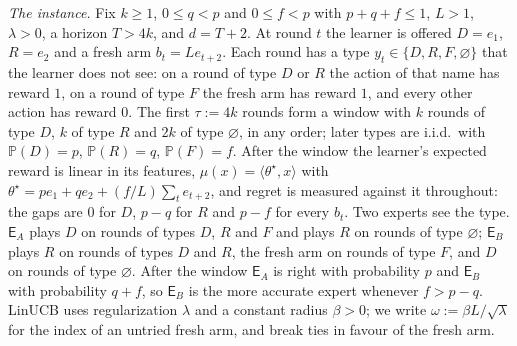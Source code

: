 \documentclass{article}
\theoremstyle{definition}
\theoremstyle{remark}
\newcommand{\Prb}{\mathbb{P}}
\theoremstyle{remark}
\newcommand{\Exp}{\mathsf{E}}
\begin{document}
\emph{The instance.} Fix $k\ge1$, $0\le q<p$ and $0\le f<p$ with $p+q+f\le1$,
$L>1$, $\lambda>0$, a horizon $T>4k$, and $d=T+2$. At round $t$ the learner is
offered $D=e_1$, $R=e_2$ and a fresh arm $b_t=Le_{t+2}$. Each round has a type
$y_t\in\{D,R,F,\varnothing\}$ that the learner does not see: on a round of
type $D$ or $R$ the action of that name has reward $1$, on a round of type $F$
the fresh arm has reward $1$, and every other action has reward $0$. The
first $\tau:=4k$ rounds form a window with $k$ rounds of type $D$, $k$ of type
$R$ and $2k$ of type $\varnothing$, in any order; later types are i.i.d.\ with
$\Prb(D)=p$, $\Prb(R)=q$, $\Prb(F)=f$. After the window the learner's expected
reward is linear in its features, $\mu(x)=\langle\theta^\star,x\rangle$ with
$\theta^\star=pe_1+qe_2+(f/L)\sum_{t}e_{t+2}$, and regret is measured against
it throughout: the gaps are $0$ for $D$, $p-q$ for $R$ and $p-f$ for every
$b_t$. Two experts see the type. $\Exp_A$ plays $D$ on rounds of types $D$,
$R$ and $F$ and plays $R$ on rounds of type $\varnothing$; $\Exp_B$ plays $R$
on rounds of types $D$ and $R$, the fresh arm on rounds of type $F$, and $D$
on rounds of type $\varnothing$. After the window $\Exp_A$ is right with
probability $p$ and $\Exp_B$ with probability $q+f$, so $\Exp_B$ is the more
accurate expert whenever $f>p-q$. LinUCB uses regularization $\lambda$ and a
constant radius $\beta>0$; we write $\omega:=\beta L/\sqrt\lambda$ for the
index of an untried fresh arm, and break ties in favour of the fresh arm.
\end{document}
